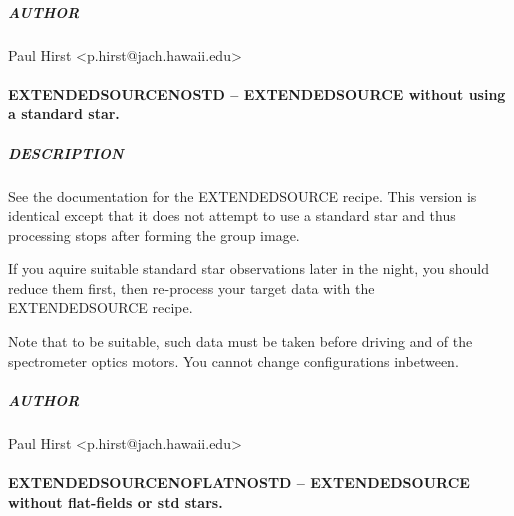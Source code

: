 \documentclass[twoside,11pt]{article}
\renewcommand{\_}{\texttt{\symbol{95}}}
\begin{document}
\subparagraph*{AUTHOR\label{EXTENDED_SOURCE_NOFLAT_--_EXTENDED_SOURCE_without_flat-fielding_AUTHOR}}

Paul Hirst <p.hirst@jach.hawaii.edu>

\paragraph*{EXTENDED\_SOURCE\_NOSTD -- EXTENDED\_SOURCE without using a standard star.\label{EXTENDED_SOURCE_NOSTD_--_EXTENDED_SOURCE_without_using_a_standard_star_}}



\subparagraph*{DESCRIPTION\label{EXTENDED_SOURCE_NOSTD_--_EXTENDED_SOURCE_without_using_a_standard_star__DESCRIPTION}}

See the documentation for the EXTENDED\_SOURCE recipe. This version is
identical except that it does not attempt to use a standard star and
thus processing stops after forming the group image.



If you aquire suitable standard star observations later in the night,
you should reduce them first, then re-process your target data with
the EXTENDED\_SOURCE recipe.



Note that to be suitable, such data must be taken before driving and
of the spectrometer optics motors. You cannot change configurations
inbetween.

\subparagraph*{AUTHOR\label{EXTENDED_SOURCE_NOSTD_--_EXTENDED_SOURCE_without_using_a_standard_star__AUTHOR}}

Paul Hirst <p.hirst@jach.hawaii.edu>

\paragraph*{EXTENDED\_SOURCE\_NOFLAT\_NOSTD -- EXTENDED\_SOURCE without flat-fields or std stars.\label{EXTENDED_SOURCE_NOFLAT_NOSTD_--_EXTENDED_SOURCE_without_flat-fields_or_std_stars_}}
\end{document}
